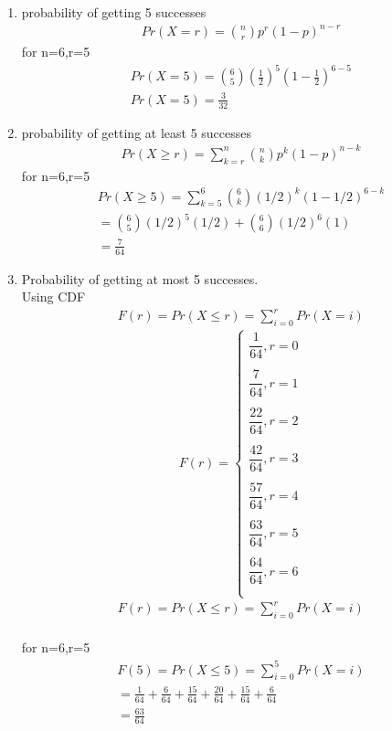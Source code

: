 \documentclass[journal,12pt,twocolumn]{IEEEtran}
\begin{document}
\begin{enumerate}
    \item probability of getting 5 successes
    \begin{align}
        Pr(X=r)= \binom{n}{r} p^{r}(1-p)^{n-r}
    \end{align}
    for n=6,r=5\\
    \begin{align}
        Pr(X=5)= \binom{6}{5} (\frac{1}{2})^{5}(1-\frac{1}{2})^{6-5}\\
        Pr(X=5)=\frac{3}{32}
    \end{align}
    \item probability of getting at least 5 successes
    \begin{align}
        Pr(X\geq r)=\sum ^{n}_{k=r} \binom{n}{k} p^k (1-p)^{n-k}
    \end{align}
    for n=6,r=5
    \begin{align}
        Pr(X\geq5)=\sum^6_{k=5}\binom{6}{k} (1/2)^k (1-1/2)^{6-k}\\
        =\binom{6}{5}(1/2)^5 (1/2) + \binom{6}{6}(1/2)^6 (1)\\
        =\frac{7}{64}
    \end{align}
    \item Probability of getting at most 5 successes.\\
 Using CDF\\
 \begin{align}
     F(r)=Pr(X\leq r)=\sum^{r}_{i=0}Pr(X=i)
 \end{align}
 $$
     F(r)= \begin{cases}
     \dfrac{1}{64} ,  r=0\\
     \\
     \dfrac{7}{64} , r=1\\
     \\
     \dfrac{22}{64} , r=2\\
     \\
     \dfrac{42}{64} , r=3\\
     \\
     \dfrac{57}{64} ,r=4\\
     \\
     \dfrac{63}{64} , r=5\\
     \\
     \dfrac{64}{64} , r=6\\
     \\
     
     
     \end{cases}
 $$
    \begin{align}
        F(r)= Pr(X\leq r)=\sum^{r}_{i=0}Pr(X=i)
    \end{align}\\
    for n=6,r=5
    \begin{align}
        F(5)=Pr(X\leq 5)=\sum^{5}_{i=0}Pr(X=i)\\
        =\frac{1}{64}+\frac{6}{64}+\frac{15}{64}+\frac{20}{64}+\frac{15}{64}+\frac{6}{64}\\
        =\frac{63}{64}
    \end{align}
    

\end{enumerate}
\end{document}
